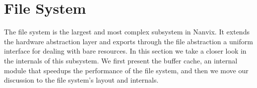 \documentclass[10pt,a4paper]{article}
\begin{document}
\section{File System}
\label{section: file system}

The file system is the largest and most complex subsystem in Nanvix. It extends the hardware abstraction layer and exports through the file abstraction a uniform interface for dealing with bare resources. In this section we take a closer look in the internals of this subsystem. We first present the buffer cache, an internal module that speedups the performance of the file system, and then we move our discussion to the file system's layout and internals.

\printbibliography
\end{document}
